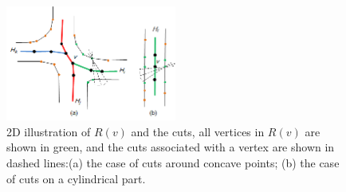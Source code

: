 \begin{figure}[tbp]
  \centering
  \includegraphics[width=0.5\textwidth]{figs/forward_tracing.png}
  \caption{\label{fig:forward_tracing}%
           2D illustration of $R(v)$ and the cuts, all vertices in $R(v)$ are shown in green, and the cuts associated with a vertex are shown in dashed lines:(a) the case of cuts around concave points; (b) the case of cuts on a cylindrical part.}
\end{figure}

